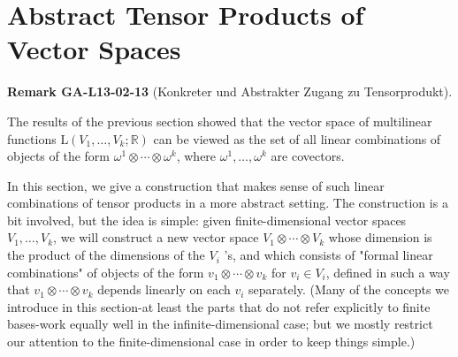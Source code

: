 \documentclass[10pt, letterpaper]{article}
\newcommand{\CustomHeading}[3]{%
  \par\medskip\noindent%
  \textbf{#1 #2} \textnormal{(#3)}.\enskip%
}
\newenvironment{REM}[2]{\begin{unitbox}\CustomHeading{Remark}{#1}{#2}}{\end{unitbox}}
\begin{document}
\section*{Abstract Tensor Products of Vector Spaces}


\begin{REM}{GA-L13-02-13}{Konkreter und Abstrakter Zugang zu Tensorprodukt}
The results of the previous section showed that the vector space of multilinear functions $\mathrm{L}\left(V_{1}, \ldots, V_{k} ; \mathbb{R}\right)$ can be viewed as the set of all linear combinations of objects of the form $\omega^{1} \otimes \cdots \otimes \omega^{k}$, where $\omega^{1}, \ldots, \omega^{k}$ are covectors. 

In this section, we give a construction that makes sense of such linear combinations of tensor products in a more abstract setting. The construction is a bit involved, but the idea is simple: given finite-dimensional vector spaces $V_{1}, \ldots, V_{k}$, we will construct a new vector space $V_{1} \otimes \cdots \otimes V_{k}$ whose dimension is the product of the dimensions of the $V_{i}$ 's, and which consists of "formal linear combinations" of objects of the form $v_{1} \otimes \cdots \otimes v_{k}$ for $v_{i} \in V_{i}$, defined in such a way that $v_{1} \otimes \cdots \otimes v_{k}$ depends linearly on each $v_{i}$ separately. (Many of the concepts we introduce in this section-at least the parts that do not refer explicitly to finite bases-work equally well in the infinite-dimensional case; but we mostly restrict our attention to the finite-dimensional case in order to keep things simple.)
\end{REM}
\end{document}
